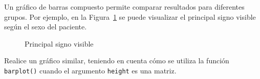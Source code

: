 \documentclass{../prob}
\begin{document}
	\begin{problema}
	Un gráfico de barras compuesto permite comparar resultados para diferentes grupos. Por ejemplo, en la Figura~\ref{fig:plot03} se puede visualizar el principal signo visible según el sexo del paciente.
\begin{figure}[!ht]
    \centering
    
    \caption{Principal signo visible}
    \label{fig:plot03}
\end{figure}	

	Realice un gráfico similar, teniendo en cuenta cómo se utiliza la función \texttt{barplot()} cuando el argumento \texttt{height} es una matriz. 

	\end{problema}

	\newpage
	
\end{document}
